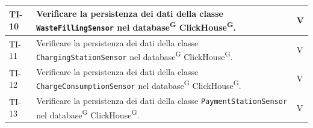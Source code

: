 \documentclass[8pt]{article}
\newcommand{\glossterm}[1]{#1\textsuperscript{G}} %
\begin{document}
\begin{longtable}{|>{\centering}p{2cm}|>{\RaggedRight}m{12cm}|>{\centering\arraybackslash}p{2cm}|}
    TI-10 & Verificare la persistenza dei dati della classe \verb|WasteFillingSensor| nel \glossterm{database} \glossterm{ClickHouse}. & V \\
    \hline
    
    TI-11 & Verificare la persistenza dei dati della classe \verb|ChargingStationSensor| nel \glossterm{database} \glossterm{ClickHouse}. & V \\
    \hline

    TI-12 & Verificare la persistenza dei dati della classe \verb|ChargeConsumptionSensor| nel \glossterm{database} \glossterm{ClickHouse}. & V \\
    \hline

    TI-13 & Verificare la persistenza dei dati della classe \verb|PaymentStationSensor| nel \glossterm{database} \glossterm{ClickHouse}. & V \\
    \hline
        
\end{longtable}
\clearpage
\end{document}
